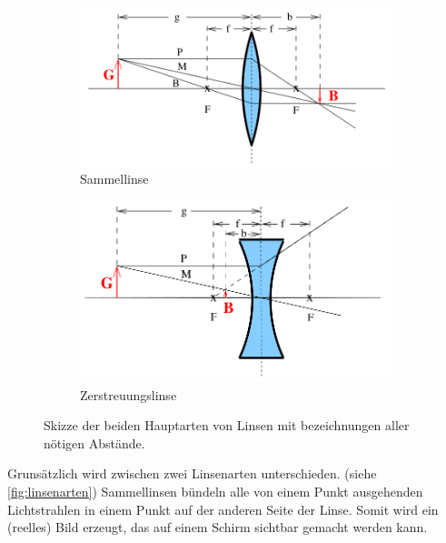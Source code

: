 \begin{figure}
    \centering
    \begin{subfigure}{0.4\textwidth}
        \centering
        \includegraphics[width=\textwidth]{images/skizze_linse_1.png}
        \caption{Sammellinse}
        \label{fig:skizze_linse_1}
    \end{subfigure}    
    \begin{subfigure}{0.4\textwidth}
        \centering
        \includegraphics[width=\textwidth]{images/skizze_linse_2.png}
        \caption{Zerstreuungslinse}
        \label{fig:skizze_linse_2}
    \end{subfigure}    
    \caption{Skizze der beiden Hauptarten von Linsen mit bezeichnungen aller nötigen Abstände. \cite{V408}}
    \label{fig:linsenarten}
\end{figure}

Grunsätzlich wird zwischen zwei Linsenarten unterschieden. (siehe \autoref{fig:linsenarten})
Sammellinsen bündeln alle von einem Punkt ausgehenden Lichtstrahlen in einem Punkt auf der anderen Seite der Linse.
Somit wird ein (reelles) Bild erzeugt, das auf einem Schirm sichtbar gemacht werden kann.

